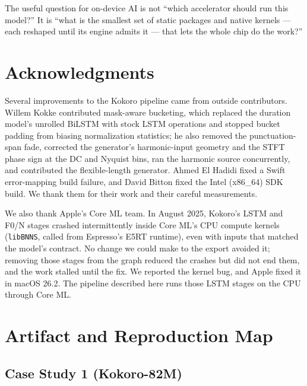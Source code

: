 \documentclass[11pt]{article}
\newcommand{\code}[1]{\texttt{#1}}
\begin{document}
The useful question for on-device AI is not ``which accelerator should run this model?'' It is ``what is the smallest set of static packages and native kernels --- each reshaped until its engine admits it --- that lets the whole chip do the work?''

\section*{Acknowledgments}

Several improvements to the Kokoro pipeline came from outside contributors. Willem Kokke contributed mask-aware bucketing, which replaced the duration model's unrolled BiLSTM with stock LSTM operations and stopped bucket padding from biasing normalization statistics; he also removed the punctuation-span fade, corrected the generator's harmonic-input geometry and the STFT phase sign at the DC and Nyquist bins, ran the harmonic source concurrently, and contributed the flexible-length generator. Ahmed El Hadidi fixed a Swift error-mapping build failure, and David Bitton fixed the Intel (x86\_64) SDK build. We thank them for their work and their careful measurements.

We also thank Apple's Core ML team. In August 2025, Kokoro's LSTM and F0/N stages crashed intermittently inside Core ML's CPU compute kernels (\code{libBNNS}, called from Espresso's E5RT runtime), even with inputs that matched the model's contract. No change we could make to the export avoided it; removing those stages from the graph reduced the crashes but did not end them, and the work stalled until the fix. We reported the kernel bug, and Apple fixed it in macOS 26.2. The pipeline described here runs those LSTM stages on the CPU through Core ML.




\appendix

\section{Artifact and Reproduction Map}\label{app:artifacts}

\subsection{Case Study 1 (Kokoro-82M)}
\end{document}
